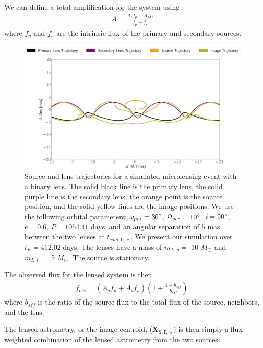 \documentclass[twocolumn]{aastex701}
\newcommand{\vect}[1]{\boldsymbol{#1}}
\newcommand{\bsff}{b_{sff}}
\newcommand{\XIvec}{\vect{X}_{\boldsymbol{S, I},\sun}}
\newcommand{\tcomnot}{t_{com,0,\sun}}
\newcommand{\w}{\omega_{pri}}
\newcommand{\bigomega}{\Omega_{sec}}
\newcommand{\inclination}{\textit{i}}
\newcommand{\period}{\textit{P}}
\begin{document}
We can define a total amplification for the system using
\begin{eqnarray}
 A = \frac{A_p f_p + A_s f_s}{f_p + f_s}
\end{eqnarray}
where $f_p$ and $f_s$ are the intrinsic flux of the primary and secondary sources.


\begin{figure}
    \centering
    \includegraphics[width= \textwidth] {figures/psbl_keplerian.png}
    \caption{Source and lens trajectories for a simulated microlensing event with a binary lens. The solid black line is the primary lens, the solid purple line is the secondary lens, the orange point is the source position, and the solid yellow lines are the image positions. We use the following orbital parameters: $\w = 30 \degree$, $\bigomega = 10 \degree$, $\inclination = 90 \degree$, $e=0.6$, $\period = 1054.41 $ days, and an angular separation of $5$ mas between the two lenses at $\tcomnot$. We present our simulation over $t_E=412.02$ days. The lenses have a mass of $m_{L,p}=$ 10 $M_\odot$ and $m_{L,s}=$ 5 $M_\odot$. The source is stationary.}
    \label{fig:psbl_keplerian}
\end{figure}

The observed flux for the lensed system is then
\begin{eqnarray}
f_{obs} = (A_p f_p + A_s f_s) \left(1 + \frac{1 - \bsff}{\bsff} \right).
\end{eqnarray}
where $\bsff$ is the ratio of the source flux to the total flux of the source, neighbors, and the lens.  

The lensed astrometry, or the image centroid, ($\XIvec$) is then simply a flux-weighted combination of the lensed astrometry from the two sources:
\end{document}
